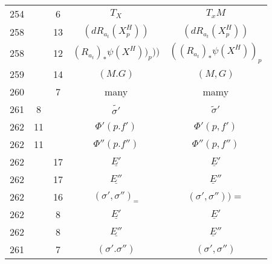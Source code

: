 \documentclass[a4paper,11pt]{article}
\begin{document}
\begin{center}
\begin{tabular}{|c|c|c|c|c|}
    254 & & \hphantom{0}6 & $T_{ X }$ & $T_{ x }M$ \\
    258 & & 13 & $( dR_{ a_{ t } }( X_{ p }^{ H } ) )$
           & $( dR_{ a_{ t } }( X_{ p }^{ H } ) )$ \\[0.5em]
    258 & & 12 & $( R_{ a_{ t } } )_{ * } \psi( X^{ H } ) )_{ p } ) )$
           & $( ( R_{ a_{ t } } )_{ * } \psi( X^{ H } ) )_{ p }$ \\
    259 & & 14 & $( M. G )$ & $( M, G )$ \\
    260 & & \hphantom{0}7 & many & mamy \\
    261 & \hphantom{0}8 & & $\widetilde{ \sigma' }$ & $\widetilde{ \sigma }'$ \\
    262 & 11 & & $\Phi'( p. f' )$ & $\Phi'( p, f' )$ \\
    262 & 11 & & $\Phi''( p. f'' )$ & $\Phi''( p, f'' )$ \\
    262 & & 17 & $\underline{ E' }$ & $\underline{ E }'$ \\
    262 & & 17 & $\underline{ E'' }$ & $\underline{ E }''$ \\
    262 & & 16 & $( \sigma', \sigma'' )_{ = }$
           & $( \sigma', \sigma'' ) ) =$ \\
    262 & & \hphantom{0}8 & $\underline{ E' }$ & $\underline{ E }'$ \\
    262 & & \hphantom{0}8 & $\underline{ E'' }$ & $\underline{ E }''$ \\
    261 & & \hphantom{0}7 & $( \sigma'. \sigma'' )$ & $( \sigma', \sigma'' )$ \\

\end{tabular}
\end{center}
\end{document}
